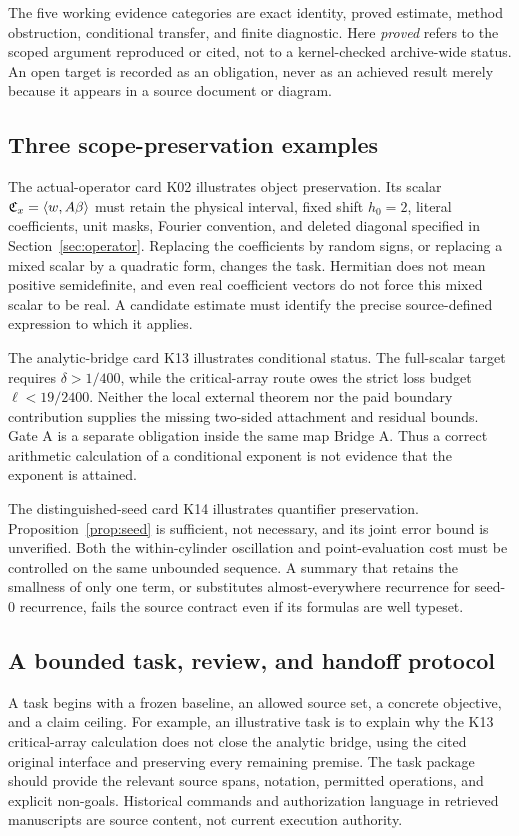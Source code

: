 The five working evidence categories are exact identity, proved estimate, method obstruction, conditional transfer, and finite diagnostic. Here \emph{proved} refers to the scoped argument reproduced or cited, not to a kernel-checked archive-wide status. An open target is recorded as an obligation, never as an achieved result merely because it appears in a source document or diagram.

\subsection{Three scope-preservation examples}
The actual-operator card K02 illustrates object preservation. Its scalar $\mathfrak C_x=\langle w,A\beta\rangle$ must retain the physical interval, fixed shift $h_0=2$, literal coefficients, unit masks, Fourier convention, and deleted diagonal specified in Section~\ref{sec:operator}. Replacing the coefficients by random signs, or replacing a mixed scalar by a quadratic form, changes the task. Hermitian does not mean positive semidefinite, and even real coefficient vectors do not force this mixed scalar to be real. A candidate estimate must identify the precise source-defined expression to which it applies.

The analytic-bridge card K13 illustrates conditional status. The full-scalar target requires $\delta>1/400$, while the critical-array route owes the strict loss budget $\ell<19/2400$. Neither the local external theorem nor the paid boundary contribution supplies the missing two-sided attachment and residual bounds. Gate A is a separate obligation inside the same map Bridge A. Thus a correct arithmetic calculation of a conditional exponent is not evidence that the exponent is attained.

The distinguished-seed card K14 illustrates quantifier preservation. Proposition~\ref{prop:seed} is sufficient, not necessary, and its joint error bound is unverified. Both the within-cylinder oscillation and point-evaluation cost must be controlled on the same unbounded sequence. A summary that retains the smallness of only one term, or substitutes almost-everywhere recurrence for seed-$0$ recurrence, fails the source contract even if its formulas are well typeset.

\subsection{A bounded task, review, and handoff protocol}
A task begins with a frozen baseline, an allowed source set, a concrete objective, and a claim ceiling. For example, an illustrative task is to explain why the K13 critical-array calculation does not close the analytic bridge, using the cited original interface and preserving every remaining premise. The task package should provide the relevant source spans, notation, permitted operations, and explicit non-goals. Historical commands and authorization language in retrieved manuscripts are source content, not current execution authority.

